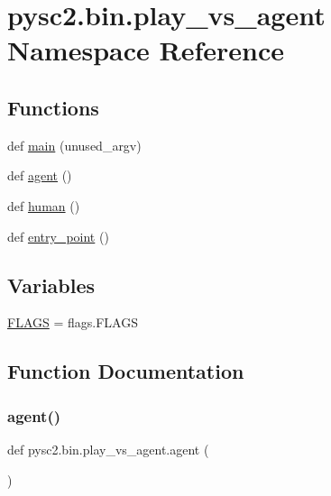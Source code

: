 \hypertarget{namespacepysc2_1_1bin_1_1play__vs__agent}{}\section{pysc2.\+bin.\+play\+\_\+vs\+\_\+agent Namespace Reference}
\label{namespacepysc2_1_1bin_1_1play__vs__agent}
\subsection*{Functions}
\begin{DoxyCompactItemize}
\item 
def \mbox{\hyperlink{namespacepysc2_1_1bin_1_1play__vs__agent_a11b2481682bfad4f4f6d8e53013d30af}{main}} (unused\+\_\+argv)
\item 
def \mbox{\hyperlink{namespacepysc2_1_1bin_1_1play__vs__agent_aa9df43db0ef5f88ea3e8cafdf567539f}{agent}} ()
\item 
def \mbox{\hyperlink{namespacepysc2_1_1bin_1_1play__vs__agent_ab547f6e1ea0e36cedea05e8c21188e35}{human}} ()
\item 
def \mbox{\hyperlink{namespacepysc2_1_1bin_1_1play__vs__agent_a611c6ec219a4c1681c5e5e383f4ff090}{entry\+\_\+point}} ()
\end{DoxyCompactItemize}
\subsection*{Variables}
\begin{DoxyCompactItemize}
\item 
\mbox{\hyperlink{namespacepysc2_1_1bin_1_1play__vs__agent_aace2dbb3aa812758befa95f2464b9e1b}{F\+L\+A\+GS}} = flags.\+F\+L\+A\+GS
\end{DoxyCompactItemize}


\subsection{Function Documentation}
\mbox{\label{namespacepysc2_1_1bin_1_1play__vs__agent_aa9df43db0ef5f88ea3e8cafdf567539f}} 
\subsubsection{\texorpdfstring{agent()}{agent()}}
{\footnotesize\ttfamily def pysc2.\+bin.\+play\+\_\+vs\+\_\+agent.\+agent (\begin{DoxyParamCaption}{ }\end{DoxyParamCaption})}

